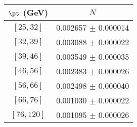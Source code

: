 \begin{tabular}{c||c}
$\pt$ (GeV) & $N$  \\
\hline
$[25, 32]$ & 0.002657 $\pm$ 0.000014\\
$[32, 39]$ & 0.003088 $\pm$ 0.000022\\
$[39, 46]$ & 0.003549 $\pm$ 0.000035\\
$[46, 56]$ & 0.002383 $\pm$ 0.000026\\
$[56, 66]$ & 0.002498 $\pm$ 0.000040\\
$[66, 76]$ & 0.001030 $\pm$ 0.000022\\
$[76, 120]$ & 0.001095 $\pm$ 0.000026\\
\end{tabular}
